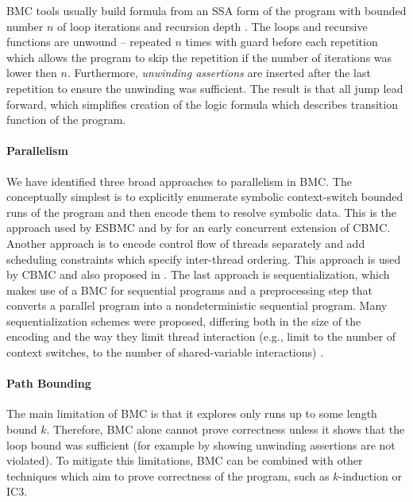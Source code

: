 BMC tools usually build formula from an SSA form of the program with bounded number $n$ of loop iterations and recursion depth .
The loops and recursive functions are unwound -- repeated $n$ times with guard before each repetition which allows the program to skip the repetition if the number of iterations was lower then $n$.
Furthermore, \emph{unwinding assertions} are inserted after the last repetition to ensure the unwinding was sufficient.
The result is that all jump lead forward, which simplifies creation of the logic formula which describes transition function of the program.

\paragraph{Parallelism}

We have identified three broad approaches to parallelism in BMC.
The conceptually simplest is to explicitly enumerate symbolic context-switch
bounded runs of the program and then encode them to resolve symbolic data.
This is the approach used by ESBMC  and by
 for an early concurrent extension of CBMC.
Another approach is to encode control flow of threads separately and add scheduling constraints which specify inter-thread ordering.
This approach is used by CBMC  and also proposed in .
The last approach is sequentialization, which makes use of a BMC for sequential programs and a preprocessing step that converts a parallel program into a nondeterministic sequential program.
Many sequentialization schemes were proposed, differing both in the size of the encoding and the way they limit thread interaction (e.g., limit to the number of context switches, to the number of shared-variable interactions) .

\paragraph{Path Bounding}

The main limitation of BMC is that it explores only runs up to some length
bound $k$.
Therefore, BMC alone cannot prove correctness unless it shows that the loop
bound was sufficient (for example by showing unwinding assertions are not
violated).
To mitigate this limitations, BMC can be combined with other techniques which
aim to prove correctness of the program, such as $k$-induction or
IC3.

